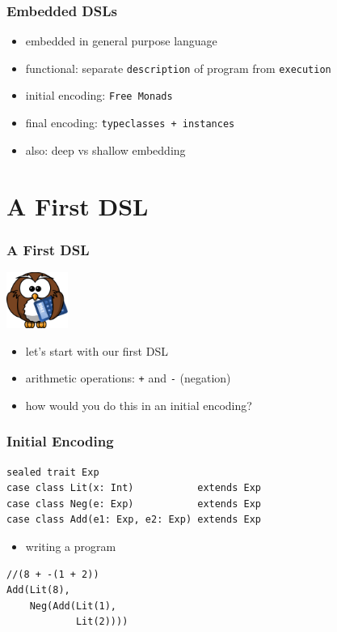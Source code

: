 \documentclass{beamer}
\begin{document}
\begin{frame}
  \frametitle{Embedded DSLs}
  \begin{itemize}
  \item embedded in general purpose language
  \item functional: separate \texttt{description} of program from
    \texttt{execution}
  \item initial encoding: \texttt{Free Monads}
  \item final encoding: \texttt{typeclasses + instances}
  \item also: deep vs shallow embedding
  \end{itemize}
\end{frame}

\section{A First DSL}

\begin{frame}
  \frametitle{A First DSL}
  \begin{center}
    \includegraphics[width=2cm]{pics/owl.png}
  \end{center}
  \begin{itemize}
  \item let's start with our first DSL
  \item arithmetic operations: \texttt{+} and \texttt{-} (negation)
  \item how would you do this in an initial encoding?
  \end{itemize}
\end{frame}

\begin{frame}
  \frametitle{Initial Encoding}
\begin{verbatim}
sealed trait Exp
case class Lit(x: Int)           extends Exp
case class Neg(e: Exp)           extends Exp
case class Add(e1: Exp, e2: Exp) extends Exp
\end{verbatim}
  \begin{itemize}
  \item writing a program
  \end{itemize}
\begin{verbatim}
//(8 + -(1 + 2))
Add(Lit(8),
    Neg(Add(Lit(1),
            Lit(2))))
\end{verbatim}
\end{frame}
\end{document}
